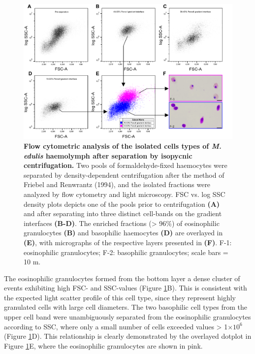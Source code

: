 \begin{figure}[H]
    \centering
    \includegraphics[width=1.0\textwidth]{figures/Method development/PERCOLL SEP II.pdf}
    \caption{\textbf{Flow cytometric analysis of the isolated cells types of \emph{M. edulis} haemolymph after separation by isopycnic centrifugation.} Two pools of formaldehyde-fixed haemocytes were separated by density-dependent centrifugation after the method of Friebel and Renwrantz (1994), and the isolated fractions were analyzed by flow cytometry and light microscopy. FSC vs. log SSC density plots depicts one of the pools prior to centrifugation \textbf{(A)} and after separating into three distinct cell-bands on the gradient interfaces \textbf{(B-D)}. The enriched fractions (> 96\%) of eosinophilic granulocytes \textbf{(B)} and basophilic haemocytes \textbf{(D)} are overlayed in \textbf{(E)}, with micrographs of the respective layers presented in \textbf{(F)}. F-1: eosinophilic granulocytes; F-2: basophilic granulocytes; scale bars = 10 \micro m. }
    \label{fig:Percoll-dotplots}
\end{figure}

The eosinophilic granulocytes formed from the bottom layer a dense cluster of events exhibiting high FSC- and SSC-values (Figure \ref{fig:Percoll-dotplots}B). This is consistent with the expected light scatter profile of this cell type, since they represent highly granulated cells with large cell diameters. The two basophilic cell types from the upper cell band were unambiguously separated from the eosinophilic granulocytes according to SSC, where only a small number of cells exceeded values > 1$\times 10^{6}$ (Figure \ref{fig:Percoll-dotplots}D). This relationship is clearly demonstrated by the overlayed dotplot in Figure \ref{fig:Percoll-dotplots}E, where the eosinophilic granulocytes are shown in pink.

